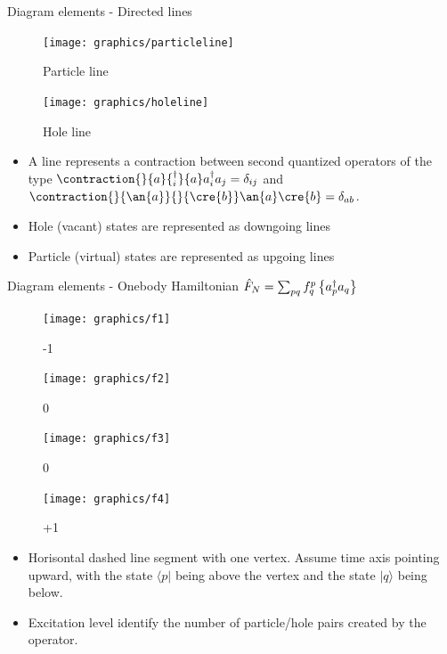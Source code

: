\begin{frame}{Diagram elements - Directed lines}
    \begin{figure}
    \centering
        \parbox{0.35\textwidth}{
            \centering
            \texttt{[image: graphics/particleline]}
            \caption{Particle line}
        } \qquad
        \parbox{0.35\textwidth}{
            \centering
            \texttt{[image: graphics/holeline]}
            \caption{Hole line}
        }
    \end{figure}

    \begin{itemize}
        \item A line represents a contraction between second quantized operators of the 
type $ \contraction{}{a}{{}^{\dagger}_i}{a}
    a^\dagger_i a_j=\delta_{ij}$ and  $\contraction{}{\an{a}}{}{\cre{b}}
\an{a}\cre{b}=\delta_{ab}$. 
        \item Hole (vacant) states are represented as downgoing lines 
        \item Particle (virtual) states are represented as upgoing lines
    \end{itemize}

\end{frame}
\begin{frame}{Diagram elements - Onebody Hamiltonian $\hat{F}_N =\sum_{pq} f_q^p \left\{a^\dagger_p a_q\right\}$}
    \renewcommand{\figurename}{Level}
    \begin{figure}
    \centering
    \parbox{0.20\textwidth}{
            \centering
            \texttt{[image: graphics/f1]}
            \caption{-1}
        }
        \parbox{0.20\textwidth}{
            \centering
            \texttt{[image: graphics/f2]}
            \caption{0}
        }
        \parbox{0.20\textwidth}{
            \centering
            \texttt{[image: graphics/f3]}
            \caption{0}
        }
        \parbox{0.20\textwidth}{
            \centering
            \texttt{[image: graphics/f4]}
            \caption{+1}
        }
    \end{figure}

    \begin{itemize}
        \item Horisontal dashed line segment with one vertex. Assume time axis pointing upward, with 
the state $\langle p|$ being above the vertex and the state $|q\rangle$ being below. 
        \item Excitation level identify the number of particle/hole pairs created by the operator.
    \end{itemize}
\end{frame}


